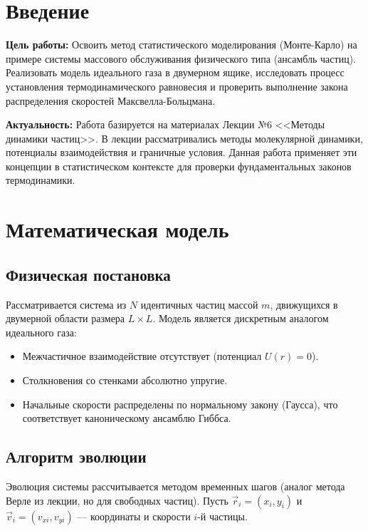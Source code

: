 \documentclass[12pt, a4paper]{article}
\begin{document}
	

	
	\section{Введение}
	
	\textbf{Цель работы:} Освоить метод статистического моделирования (Монте-Карло) на примере системы массового обслуживания физического типа (ансамбль частиц). Реализовать модель идеального газа в двумерном ящике, исследовать процесс установления термодинамического равновесия и проверить выполнение закона распределения скоростей Максвелла-Больцмана.
	
	\textbf{Актуальность:} Работа базируется на материалах Лекции №6 <<Методы динамики частиц>>. В лекции рассматривались методы молекулярной динамики, потенциалы взаимодействия и граничные условия. Данная работа применяет эти концепции в статистическом контексте для проверки фундаментальных законов термодинамики.
	
	\section{Математическая модель}
	
	\subsection{Физическая постановка}
	Рассматривается система из $N$ идентичных частиц массой $m$, движущихся в двумерной области размера $L \times L$. Модель является дискретным аналогом идеального газа:
	\begin{itemize}
		\item Межчастичное взаимодействие отсутствует (потенциал $U(r) = 0$).
		\item Столкновения со стенками абсолютно упругие.
		\item Начальные скорости распределены по нормальному закону (Гаусса), что соответствует каноническому ансамблю Гиббса.
	\end{itemize}
	
	\subsection{Алгоритм эволюции}
	Эволюция системы рассчитывается методом временных шагов (аналог метода Верле из лекции, но для свободных частиц). Пусть $\vec{r}_i = (x_i, y_i)$ и $\vec{v}_i = (v_{xi}, v_{yi})$ --- координаты и скорости $i$-й частицы.
	
\end{document}
